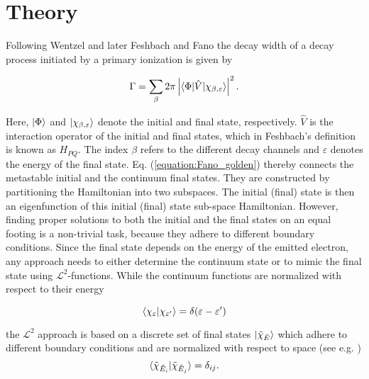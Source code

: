 \documentclass[aps,amssymb,preprint,a4paper]{revtex4}
\begin{document}
%
\section{Theory}
\label{section:theory}

Following Wentzel \cite{Wentzel27} and later Feshbach \cite{Feshbach58,Feshbach62}
and Fano \cite{Fano61}
the decay width of a decay process initiated by a
primary ionization is given by 

\begin{equation} \label{equation:Fano_golden}
  \Gamma = \sum_\beta 2\pi
           \left| \braket{\Phi|\hat{V}|\chi_{\beta,\varepsilon}} \right|^2 .
\end{equation}

Here, $\ket{\Phi}$ and $\ket{\chi_{\beta,\varepsilon}}$ denote the initial and
final state, respectively. $\hat{V}$ is the interaction operator of the
initial and final states, which in Feshbach's definition is known as $H_{PQ}$.
The index $\beta$ refers to the different
decay channels and $\varepsilon$ denotes the energy of the final state.
Eq. (\ref{equation:Fano_golden}) thereby connects the metastable initial
and the continuum final states. They are constructed by partitioning the
Hamiltonian into two subspaces. The initial (final) state is then an
eigenfunction of this initial (final) state sub-space Hamiltonian.
However, finding proper solutions to both the initial and the final
states on an equal footing is a non-trivial task, because they adhere to
different boundary conditions. Since the final state depends on the energy
of the emitted electron, any approach needs to either determine the continuum
state or to mimic the final state using $\mathcal{L}^2$-functions.
While the continuum functions are normalized with respect to their energy

\begin{equation}
 \braket{\chi_\varepsilon| \chi_{\varepsilon'}} = \delta(\varepsilon-\varepsilon')
\end{equation}

the $\mathcal{L}^2$ approach is based on a discrete set of final states
$\ket{\tilde{\chi}_{\tilde{E}}}$
which adhere to different boundary
conditions and are normalized with respect to space (see e.g. \cite{Craigie14})
\begin{equation}
 \braket{ \tilde{\chi}_{\tilde{E}_i} | \tilde{\chi}_{\tilde{E}_j} } = \delta_{ij}.
\end{equation}
\end{document}
